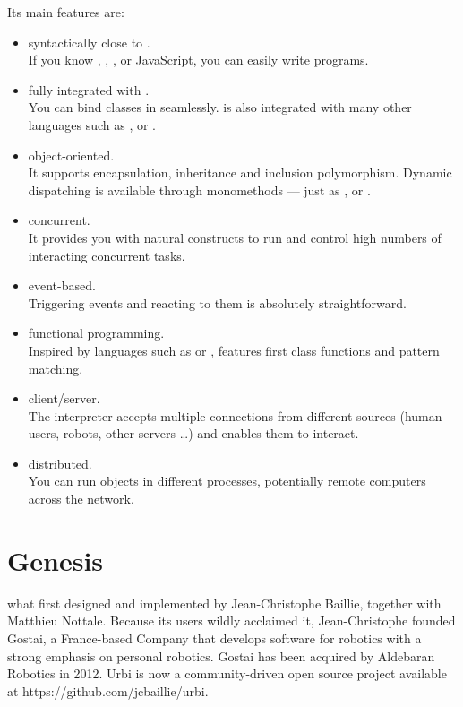 \medskip

Its main features are:
\begin{itemize}
\item syntactically close to \Cxx.\\
  If you know \langC, \Cxx, \Java, or JavaScript, you can easily write \us
  programs.
\item fully integrated with \Cxx.\\
  You can bind \Cxx classes in \us seamlessly. \us is also integrated with
  many other languages such as \Java, \MatLab or \Python.
\item object-oriented.\\
  It supports encapsulation, inheritance and inclusion polymorphism. Dynamic
  dispatching is available through monomethods --- just as \Cxx, \Cs or
  \Java.
\item concurrent.\\
  It provides you with natural constructs to run and control high numbers of
  interacting concurrent tasks.
\item event-based.\\
  Triggering events and reacting to them is absolutely straightforward.
\item functional programming.\\
  Inspired by languages such as \Lisp or \Caml, \us features first class
  functions and pattern matching.
\item client/server.\\
  The interpreter accepts multiple connections from different sources (human
  users, robots, other servers \ldots) and enables them to interact.
\item distributed.\\
  You can run objects in different processes, potentially remote computers
  across the network.
\end{itemize}

\section{Genesis}
\label{sec:genesis}
\urbi what first designed and implemented by Jean-Christophe Baillie,
together with Matthieu Nottale.  Because its users wildly acclaimed it,
Jean-Christophe founded Gostai, a France-based Company that develops
software for robotics with a strong emphasis on personal robotics. Gostai 
has been acquired by Aldebaran Robotics in 2012. Urbi is now a community-driven
open source project available at https://github.com/jcbaillie/urbi.

